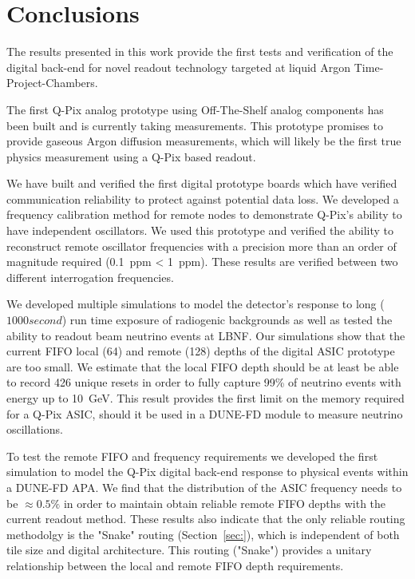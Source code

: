 \section{Conclusions}

The results presented in this work provide the first tests and verification of the digital back-end for novel readout technology targeted at liquid Argon Time-Project-Chambers.

The first Q-Pix analog prototype using Off-The-Shelf analog components has been built and is currently taking measurements.
This prototype promises to provide gaseous Argon diffusion measurements, which will likely be the first true physics measurement using a Q-Pix based readout.

We have built and verified the first digital prototype boards which have verified communication reliability to protect against potential data loss.
We developed a frequency calibration method for remote nodes to demonstrate Q-Pix's ability to have independent oscillators.
We used this prototype and verified the ability to reconstruct remote oscillator frequencies with a precision more than an order of magnitude required (0.1~\unit{ppm} < 1~\unit{ppm}).
These results are verified between two different interrogation frequencies.

We developed multiple simulations to model the detector's response to long ($1000 second$) run time exposure of radiogenic backgrounds as well as tested the ability to readout beam neutrino events at LBNF.
Our simulations show that the current FIFO local (64) and remote (128) depths of the digital ASIC prototype are too small.
We estimate that the local FIFO depth should be at least be able to record 426 unique resets in order to fully capture 99\% of neutrino events with energy up to 10~\unit{GeV}.
This result provides the first limit on the memory required for a Q-Pix ASIC, should it be used in a DUNE-FD module to measure neutrino oscillations.

To test the remote FIFO and frequency requirements we developed the first simulation to model the Q-Pix digital back-end response to physical events within a DUNE-FD APA.
We find that the distribution of the ASIC frequency needs to be $\approx 0.5\%$ in order to maintain obtain reliable remote FIFO depths with the current readout method. 
These results also indicate that the only reliable routing methodolgy is the "Snake" routing (Section~\ref{sec:}), which is independent of both tile size and digital architecture.
This routing ("Snake") provides a unitary relationship between the local and remote FIFO depth requirements.

